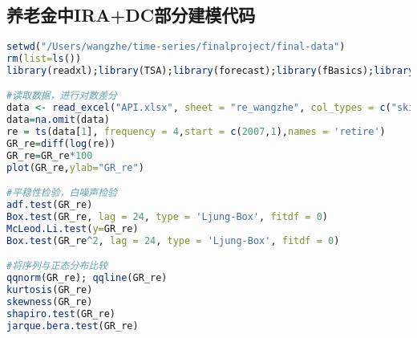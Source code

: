 \subsection{养老金中IRA+DC部分建模代码}
\begin{lstlisting}[language=R,frame=single]
setwd("/Users/wangzhe/time-series/finalproject/final-data")
rm(list=ls())
library(readxl);library(TSA);library(forecast);library(fBasics);library(rugarch)

#读取数据，进行对数差分
data <- read_excel("API.xlsx", sheet = "re_wangzhe", col_types = c("skip", "skip", "skip", "skip","numeric","skip"))
data=na.omit(data)
re = ts(data[1], frequency = 4,start = c(2007,1),names = 'retire')
GR_re=diff(log(re))
GR_re=GR_re*100
plot(GR_re,ylab="GR_re")

#平稳性检验，白噪声检验
adf.test(GR_re)
Box.test(GR_re, lag = 24, type = 'Ljung-Box', fitdf = 0)
McLeod.Li.test(y=GR_re)
Box.test(GR_re^2, lag = 24, type = 'Ljung-Box', fitdf = 0)

#将序列与正态分布比较
qqnorm(GR_re); qqline(GR_re)
kurtosis(GR_re)
skewness(GR_re)
shapiro.test(GR_re)
jarque.bera.test(GR_re)
\end{lstlisting}


